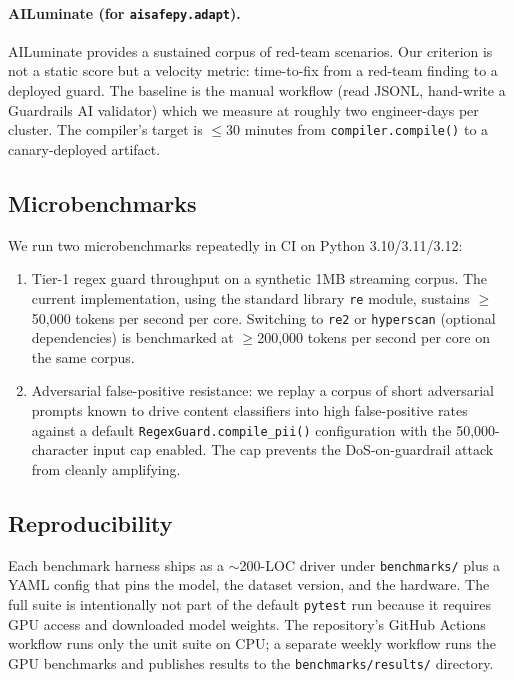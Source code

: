 \paragraph{AILuminate (for \texttt{aisafepy.adapt}).} AILuminate
provides a sustained corpus of red-team scenarios. Our criterion is
not a static score but a velocity metric: time-to-fix from a
red-team finding to a deployed guard. The baseline is the manual
workflow (read JSONL, hand-write a Guardrails AI validator) which we
measure at roughly two engineer-days per cluster. The compiler's
target is $\leq$30 minutes from \texttt{compiler.compile()} to a
canary-deployed artifact.

\subsection{Microbenchmarks}

We run two microbenchmarks repeatedly in CI on Python 3.10/3.11/3.12:

\begin{enumerate}[leftmargin=2em, itemsep=0.25em]
  \item Tier-1 regex guard throughput on a synthetic 1MB streaming
    corpus. The current implementation, using the standard library
    \texttt{re} module, sustains $\geq$50,000 tokens per second per
    core. Switching to \texttt{re2} or \texttt{hyperscan} (optional
    dependencies) is benchmarked at $\geq$200,000 tokens per second
    per core on the same corpus.

  \item Adversarial false-positive resistance: we replay a corpus
    of short adversarial prompts known to drive content classifiers
    into high false-positive rates against a default
    \texttt{RegexGuard.compile\_pii()} configuration with the
    50,000-character input cap enabled. The cap prevents the
    DoS-on-guardrail attack from cleanly amplifying.
\end{enumerate}

\subsection{Reproducibility}

Each benchmark harness ships as a $\sim$200-LOC driver under
\texttt{benchmarks/} plus a YAML config that pins the model, the
dataset version, and the hardware. The full suite is intentionally
not part of the default \texttt{pytest} run because it requires GPU
access and downloaded model weights. The repository's GitHub Actions
workflow runs only the unit suite on CPU; a separate weekly workflow
runs the GPU benchmarks and publishes results to the
\texttt{benchmarks/results/} directory.

